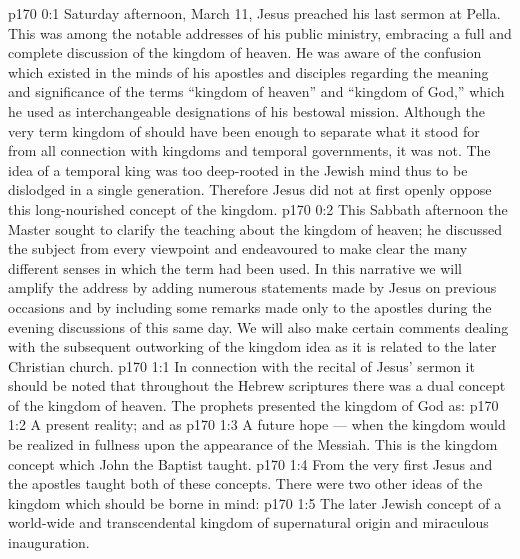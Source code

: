 \author{Midwayer Commission}
\vs p170 0:1 Saturday afternoon, March 11, Jesus preached his last sermon at Pella. This was among the notable addresses of his public ministry, embracing a full and complete discussion of the kingdom of heaven. He was aware of the confusion which existed in the minds of his apostles and disciples regarding the meaning and significance of the terms “kingdom of heaven” and “kingdom of God,” which he used as interchangeable designations of his bestowal mission. Although the very term kingdom of  should have been enough to separate what it stood for from all connection with  kingdoms and temporal governments, it was not. The idea of a temporal king was too deep\hyp{}rooted in the Jewish mind thus to be dislodged in a single generation. Therefore Jesus did not at first openly oppose this long\hyp{}nourished concept of the kingdom.
\vs p170 0:2 This Sabbath afternoon the Master sought to clarify the teaching about the kingdom of heaven; he discussed the subject from every viewpoint and endeavoured to make clear the many different senses in which the term had been used. In this narrative we will amplify the address by adding numerous statements made by Jesus on previous occasions and by including some remarks made only to the apostles during the evening discussions of this same day. We will also make certain comments dealing with the subsequent outworking of the kingdom idea as it is related to the later Christian church.
\vs p170 1:1 In connection with the recital of Jesus’ sermon it should be noted that throughout the Hebrew scriptures there was a dual concept of the kingdom of heaven. The prophets presented the kingdom of God as:
\vs p170 1:2 \bibnobreakspace A present reality; and as
\vs p170 1:3 \bibnobreakspace A future hope --- when the kingdom would be realized in fullness upon the appearance of the Messiah. This is the kingdom concept which John the Baptist taught.
\vs p170 1:4 From the very first Jesus and the apostles taught both of these concepts. There were two other ideas of the kingdom which should be borne in mind:
\vs p170 1:5 \bibnobreakspace The later Jewish concept of a world\hyp{}wide and transcendental kingdom of supernatural origin and miraculous inauguration.

